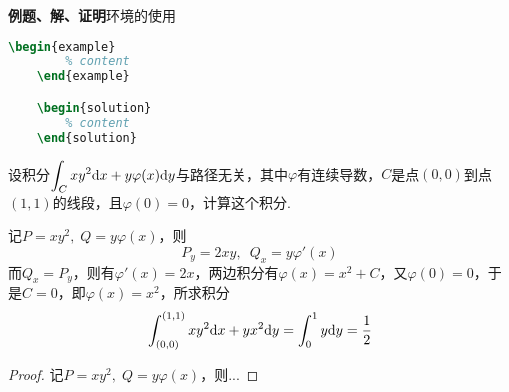 \documentclass[12pt, a4paper, oneside, UTF8]{ctexbook}
\begin{document}

\textbf{例题、解、证明}环境的使用
\begin{lstlisting}[language=TeX]
    \begin{example}
        % content
    \end{example}

    \begin{solution}
        % content
    \end{solution}
\end{lstlisting}

\begin{example}
    设积分$\displaystyle\int_C xy^2\mathrm{d} x +y \varphi(x)\mathrm{d} y$与路径无关，其中$\varphi$有连续导数，$C$是点$(0,0)$到点$(1,1)$的线段，且$\varphi(0)=0$，计算这个积分.
\end{example}
\begin{solution}
    记$P = xy^2,\; Q = y\varphi(x)$，则
    \[
        P_y =2xy ,\enspace Q_x = y\varphi'(x)
    \]
    而$Q_x = P_y$，则有$\varphi'(x) = 2x$，两边积分有$\varphi(x) = x^2+C$，又$\varphi(0)=0$，于是$C=0$，即$\varphi(x) = x^2$，所求积分
    \[
        \int_{(0,0)}^{(1,1)} xy^2\mathrm{d} x +y x^2\mathrm{d} y  = \int_0^1 y \mathrm{d} y = \frac{1}{2}
    \]
\end{solution}

\begin{proof}
    记$P = xy^2,\; Q = y\varphi(x)$，则...
\end{proof}


\ifx\allfiles\undefined
\end{document}
